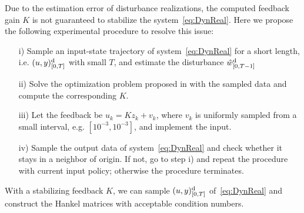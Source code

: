 Due to the estimation error of disturbance realizations, the computed feedback gain $K$ is not guaranteed to stabilize the system~\eqref{eq:DynReal}. Here we propose the following experimental procedure to resolve this issue:
\begin{itemize}
	\item[i)] Sample an input-state trajectory of system~\eqref{eq:DynReal} for a short length, i.e. $(u,y)_{[0,T]}^{\mathrm{d}}$ with small $T$, and estimate the disturbance $\hat{w}_{[0,T-1]}^{\mathrm{d}}$
	\item[ii)] Solve the optimization problem proposed in \citet{pan24data} with the sampled data and compute the corresponding $K$.
	\item[iii)] Let the feedback be $u_k = Kz_k + v_k$, where $v_k$ is uniformly sampled from a small interval, e.g. $[10^{-3},10^{-3}]$, and implement the input.
	\item[iv)] Sample the output data of system~\eqref{eq:DynReal} and check whether it stays in a neighbor of origin. If not, go to step i) and repeat the procedure with current input policy; otherwise the procedure terminates.
\end{itemize}
With a stabilizing feedback $K$, we can sample $(u,y)_{[0,T]}^{\mathrm{d}}$ of~\eqref{eq:DynReal} and construct the Hankel matrices with acceptable condition numbers. 

